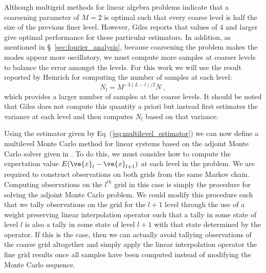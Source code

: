 \documentclass[note]{TechNote}
\begin{document}
Although multigrid methods for linear algebra problems indicate that a
coarsening parameter of $M = 2$ is optimal such that every coarse
level is half the size of the previous finer level. However, Giles
reports that values of 4 and larger give optimal performance for these
particular estimators. In addition, as mentioned in
\S~\ref{sec:fourier_analysis}, because coarsening the problem makes
the modes appear more oscillatory, we must compute more samples at
coarser levels to balance the error amongst the levels. For this work
we will use the result reported by Heinrich for computing the number
of samples at each level:
\begin{equation}
  N_l = M^{-3(L-l)/2}N\:,
  \label{eq:level_histories}
\end{equation}
which provides a larger number of samples at the coarse levels. It
should be noted that Giles does not compute this quantity a priori but
instead first estimates the variance at each level and then computes
$N_l$ based on that variance.

Using the estimator given by Eq~(\ref{eq:multilevel_estimator}) we can
now define a multilevel Monte Carlo method for linear systems based on
the adjoint Monte Carlo solver given in \cite{evans_monte_2012}. To do
this, we must consider how to compute the expectation value
$E(\ve{x}_{l} - \ve{x}_{l+1})$ at each level in the problem. We are
required to construct observations on both grids from the same Markov
chain. Computing observations on the $l^{th}$ grid in this case is
simply the procedure for solving the adjoint Monte Carlo problem. We
could modify this procedure such that we tally observations on the
grid for the $l+1$ level through the use of a weight preserving linear
interpolation operator such that a tally in some state of level $l$ is
also a tally in some state of level $l+1$ with that state determined
by the operator. If this is the case, then we can actually avoid
tallying observations of the coarse grid altogether and simply apply
the linear interpolation operator the fine grid results once all
samples have been computed instead of modifying the Monte Carlo
sequence.
\end{document}
